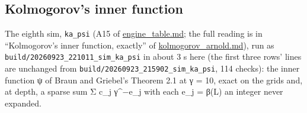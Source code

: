 \subsection{\texorpdfstring{Kolmogorov's inner function}{Kolmogorov's inner function}}

The eighth sim, \texttt{ka\_\allowbreak{}psi} (A15 of \hyperref[chap:engine-table]{engine\_\allowbreak{}table.md}; the full reading is in “Kolmogorov's inner function, exactly” of \hyperref[chap:kolmogorov-arnold]{kolmogorov\_\allowbreak{}arnold.md}), run as \texttt{build/\allowbreak{}20260923\_\allowbreak{}221011\_\allowbreak{}sim\_\allowbreak{}ka\_\allowbreak{}psi} in about 3 s here (the first three rows' lines are unchanged from \texttt{build/\allowbreak{}20260923\_\allowbreak{}215902\_\allowbreak{}sim\_\allowbreak{}ka\_\allowbreak{}psi}, 114 checks): the inner function ψ of Braun and Griebel's Theorem 2.1 at γ = 10, exact on the grids and, at depth, a sparse sum Σ c\_\allowbreak{}j γ\textasciicircum{}−e\_\allowbreak{}j with each e\_\allowbreak{}j = β(L) an integer never expanded.

